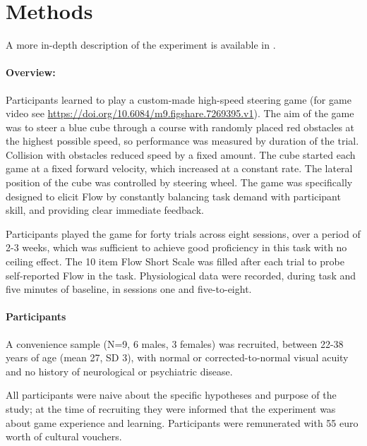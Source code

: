 \documentclass[10pt,letterpaper,floatsintext]{article}
\begin{document}
\section{Methods}

A more in-depth description of the experiment is available in \cite{Cowley2019flow}.

\paragraph{Overview:}
Participants learned to play a custom-made high-speed steering game (for game video see \url{https://doi.org/10.6084/m9.figshare.7269395.v1}). The aim of the game was to steer a blue cube through a course with randomly placed red obstacles at the highest possible speed, so performance was measured by duration of the trial. Collision with obstacles reduced speed by a fixed amount. The cube started each game at a fixed forward velocity, which increased at a constant rate. The lateral position of the cube was controlled by steering wheel. The game was specifically designed to elicit Flow by constantly balancing task demand with participant skill, and providing clear immediate feedback.

Participants played the game for forty trials across eight sessions, over a period of 2-3 weeks, which was sufficient to achieve good proficiency in this task with no ceiling effect. The 10 item Flow Short Scale \cite{Engeser2008} was filled after each trial to probe self-reported Flow in the task. Physiological data were recorded, during task and five minutes of baseline, in sessions one and five-to-eight.


\paragraph{Participants}
A convenience sample (N=9, 6 males, 3 females) was recruited, between 22-38 years of age (mean 27, SD 3), with normal or corrected-to-normal visual acuity and no history of neurological or psychiatric disease.

All participants were naive about the specific hypotheses and purpose of the study; at the time of recruiting they were informed that the experiment was about game experience and learning. Participants were remunerated with 55 euro worth of cultural vouchers.
\end{document}
